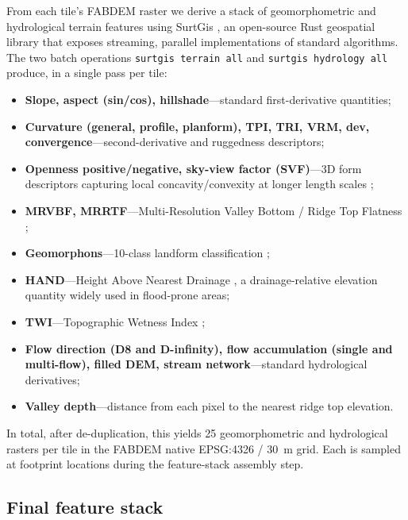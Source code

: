 \documentclass[preprint,authoryear,number]{elsarticle}
\begin{document}
From each tile's FABDEM raster we derive a stack of geomorphometric and hydrological terrain features using SurtGis \citep{SurtGis2026}, an open-source Rust geospatial library that exposes streaming, parallel implementations of standard algorithms. The two batch operations \texttt{surtgis terrain all} and \texttt{surtgis hydrology all} produce, in a single pass per tile:

\begin{itemize}
\item \textbf{Slope, aspect (sin/cos), hillshade}---standard first-derivative quantities;
\item \textbf{Curvature (general, profile, planform), TPI, TRI, VRM, dev, convergence}---second-derivative and ruggedness descriptors;
\item \textbf{Openness positive/negative, sky-view factor (SVF)}---3D form descriptors capturing local concavity/convexity at longer length scales \citep{Yokoyama2002Openness};
\item \textbf{MRVBF, MRRTF}---Multi-Resolution Valley Bottom / Ridge Top Flatness \citep{Gallant2003MRVBF};
\item \textbf{Geomorphons}---10-class landform classification \citep{Jasiewicz2013Geomorphons};
\item \textbf{HAND}---Height Above Nearest Drainage \citep{Nobre2011HAND}, a drainage-relative elevation quantity widely used in flood-prone areas;
\item \textbf{TWI}---Topographic Wetness Index \citep{Beven1979TOPMODEL};
\item \textbf{Flow direction (D8 and D-infinity), flow accumulation (single and multi-flow), filled DEM, stream network}---standard hydrological derivatives;
\item \textbf{Valley depth}---distance from each pixel to the nearest ridge top elevation.
\end{itemize}

In total, after de-duplication, this yields 25 geomorphometric and hydrological rasters per tile in the FABDEM native EPSG:4326 / \SI{30}{\meter} grid. Each is sampled at footprint locations during the feature-stack assembly step.

\subsection{Final feature stack}
\label{sec:feature_stack}
\end{document}
